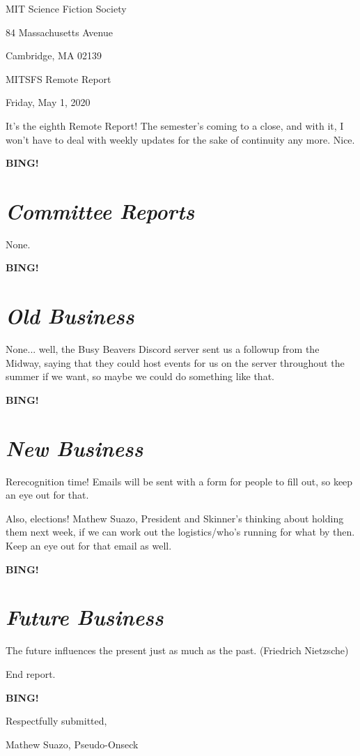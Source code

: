 \documentclass[10pt]{article}
\newcommand{\bing}{{\bf BING!} }
\newcommand{\goto}[1]{\bing \vskip 12pt \section*{{\em{#1}}}}
\newcommand{\skinner}{Mathew Suazo, President and Skinner\xspace}
\newcommand{\onseck}{Mathew Suazo, Pseudo-Onseck\xspace}
\newcommand{\meetingdate}{Friday, May 1, 2020}
\begin{document}
\begin{center}

MIT Science Fiction Society

84 Massachusetts Avenue

Cambridge, MA 02139

\vspace{12pt}

MITSFS Remote Report

\meetingdate

\end{center}

\vspace{18pt}

\setlength{\parskip}{6pt}

\noindent
It's the eighth Remote Report! The semester's coming to a close, and with it, I won't have to deal with weekly updates for the sake of continuity any more. Nice.

\goto{Committee Reports}

None.

\goto{Old Business}

None... well, the Busy Beavers Discord server sent us a followup from the Midway, saying that they could host events for us on the server throughout the summer if we want, so maybe we could do something like that.

\goto{New Business}

Rerecognition time! Emails will be sent with a form for people to fill out, so keep an eye out for that.

Also, elections! \skinner's thinking about holding them next week, if we can work out the logistics/who's running for what by then. Keep an eye out for that email as well.

\goto{Future Business}

The future influences the present just as much as the past. (Friedrich Nietzsche)

\noindent
End report.

\bing
\vspace{18pt}

\centerline{Respectfully submitted,}
\centerline{\onseck}
\end{document}
